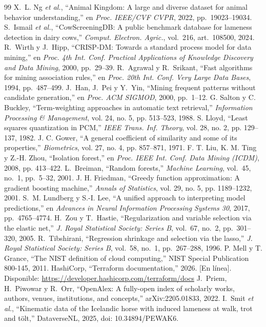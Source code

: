 \documentclass[conference,a4paper]{IEEEtran}
\begin{document}
\begin{thebibliography}{99}
 X.~L. Ng \emph{et al.}, ``Animal Kingdom: A large and diverse dataset for animal behavior understanding,'' en \emph{Proc. IEEE/CVF CVPR}, 2022, pp.~19023--19034.
 S.~Ismail \emph{et al.}, ``CowScreeningDB: A public benchmark database for lameness detection in dairy cows,'' \emph{Comput. Electron. Agric.}, vol.~216, art.~108500, 2024.
 R.~Wirth y J.~Hipp, ``CRISP-DM: Towards a standard process model for data mining,'' en \emph{Proc. 4th Int. Conf. Practical Applications of Knowledge Discovery and Data Mining}, 2000, pp.~29--39.
 R.~Agrawal y R.~Srikant, ``Fast algorithms for mining association rules,'' en \emph{Proc. 20th Int. Conf. Very Large Data Bases}, 1994, pp.~487--499.
 J.~Han, J.~Pei y Y.~Yin, ``Mining frequent patterns without candidate generation,'' en \emph{Proc. ACM SIGMOD}, 2000, pp.~1--12.
 G. Salton y C. Buckley, ``Term-weighting approaches in automatic text retrieval,'' \emph{Information Processing \& Management}, vol. 24, no. 5, pp. 513--523, 1988.
 S. Lloyd, ``Least squares quantization in PCM,'' \emph{IEEE Trans. Inf. Theory}, vol. 28, no. 2, pp. 129--137, 1982.
 J. C. Gower, ``A general coefficient of similarity and some of its properties,'' \emph{Biometrics}, vol. 27, no. 4, pp. 857--871, 1971.
 F. T. Liu, K. M. Ting y Z.-H. Zhou, ``Isolation forest,'' en \emph{Proc. IEEE Int. Conf. Data Mining (ICDM)}, 2008, pp. 413--422.
 L.~Breiman, ``Random forests,'' \emph{Machine Learning}, vol.~45, no.~1, pp.~5--32, 2001.
 J. H. Friedman, ``Greedy function approximation: A gradient boosting machine,'' \emph{Annals of Statistics}, vol. 29, no. 5, pp. 1189--1232, 2001.
 S.~M. Lundberg y S.-I. Lee, ``A unified approach to interpreting model predictions,'' en \emph{Advances in Neural Information Processing Systems 30}, 2017, pp.~4765--4774.
 H.~Zou y T.~Hastie, ``Regularization and variable selection via the elastic net,'' \emph{J. Royal Statistical Society: Series B}, vol.~67, no.~2, pp.~301--320, 2005.
 R.~Tibshirani, ``Regression shrinkage and selection via the lasso,'' \emph{J. Royal Statistical Society: Series B}, vol.~58, no.~1, pp.~267--288, 1996.
 P. Mell y T. Grance, ``The NIST definition of cloud computing,'' NIST Special Publication 800-145, 2011.
 HashiCorp, ``Terraform documentation,'' 2026. [En línea]. Disponible: \url{https://developer.hashicorp.com/terraform/docs}
 J.~Priem, H.~Piwowar y R.~Orr, ``OpenAlex: A fully-open index of scholarly works, authors, venues, institutions, and concepts,'' arXiv:2205.01833, 2022.
 I.~Smit \emph{et al.}, ``Kinematic data of the Icelandic horse with induced lameness at walk, trot and tölt,'' DataverseNL, 2025, doi: 10.34894/PEWAK6.
\end{thebibliography}
\end{document}
